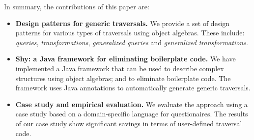 \begin{comment}

Static types are useful to distinguish between different kinds
of nodes in a structure and to prevent misuses. The
distinction between different types of nodes also means that code for
dealing with each type of node is needed. However, in large structures, 
such as the Abstract Syntax Tree (AST) of a programming language, 
the amount of required code can be a problem. For some operations, 
which traverse large structures, most of the code amounts to recursively 
delegating the traversal to the child nodes. Only for some nodes 
of the structure the code needs to do something different. Still 
the programmer needs to diligently and tediously write the error-prone 
traversal code for all nodes.

In this paper we present a framework 

This approach works well for many operations,
which need different (and non-trivial) code for each different type 
of node 




The problem is particularly prominent 
in statically typed languages, where the typing discipline 
enforces strict distinctions between different cases 

Operations that traverse complex structures often require large and 
tedious amounts of boilerplate code. In those operations there are 
typically a few 

A pervasive problem in programming occurs when large tree tr

\end{comment}

In summary, the contributions of this paper are:

\begin{itemize}

\item {\bf Design patterns for generic traversals.} We provide a set of design 
patterns for various types of traversals using object algebras. These include: 
\emph{queries}, \emph{transformations},
\emph{generalized queries} and \emph{generalized transformations}.

\item {\bf Shy: a Java framework for eliminating boilerplate code.} We have implemented 
a Java framework that can be used to describe complex structures using 
object algebras; and to eliminate boilerplate code. The framework uses Java 
annotations to automatically generate generic traversals.

\item {\bf Case study and empirical evaluation.} We evaluate the approach using 
a case study based on a domain-specific language for questionaires. The results 
of our case study show significant savings in terms of user-defined traversal code.

\end{itemize}
